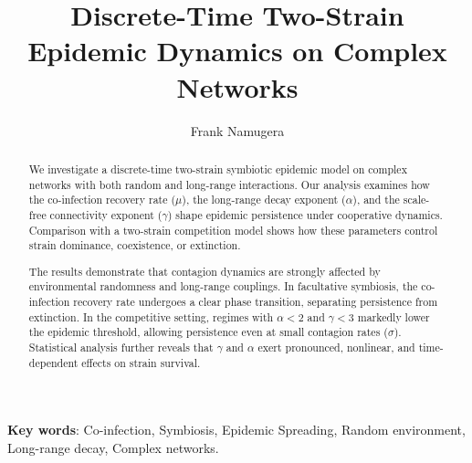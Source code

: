 \documentclass[a4paper,12pt]{scrartcl}
\title{Discrete-Time Two-Strain Epidemic Dynamics on Complex Networks}
\author[1]{\normalsize Frank Namugera}
\affil[1]{\itshape Mathematics Department, Makerere University, Kampala, Uganda}
\affil[ ]{Email: \texttt{frank.namugera@mak.ac.ug} \vspace{-3em}}
\date{}
\theoremstyle{plain}%
\theoremstyle{definition}
\theoremstyle{remark}
\numberwithin{equation}{section}
\begin{document}
\maketitle

\begin{abstract}

We investigate a discrete-time two-strain symbiotic epidemic model on complex networks with both random and long-range interactions. Our analysis examines how the co-infection recovery rate ($\mu$), the long-range decay exponent ($\alpha$), and the scale-free connectivity exponent ($\gamma$) shape epidemic persistence under cooperative dynamics. Comparison with a two-strain competition model shows how these parameters control strain dominance, coexistence, or extinction.

The results demonstrate that contagion dynamics are strongly affected by environmental randomness and long-range couplings. In facultative symbiosis, the co-infection recovery rate undergoes a clear phase transition, separating persistence from extinction. In the competitive setting, regimes with $\alpha < 2$ and $\gamma < 3$ markedly lower the epidemic threshold, allowing persistence even at small contagion rates ($\sigma$). Statistical analysis further reveals that $\gamma$ and $\alpha$ exert pronounced, nonlinear, and time-dependent effects on strain survival.

\end{abstract}


\textbf{Key words}: Co-infection, Symbiosis, Epidemic Spreading, Random environment, Long-range decay, Complex networks.

\end{document}
